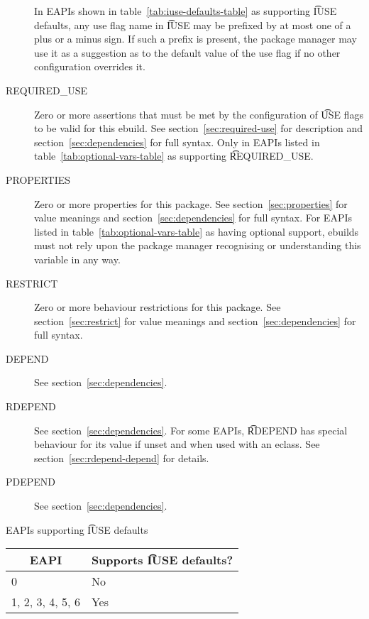 \begin{description}
     In EAPIs shown in table~\ref{tab:iuse-defaults-table} as supporting
    \t{IUSE} defaults, any use flag name in \t{IUSE} may be prefixed by at most one of a plus or a
    minus sign. If such a prefix is present, the package manager may use it as a suggestion as to
    the default value of the use flag if no other configuration overrides it.
\item[REQUIRED_USE]  Zero or more assertions that must be met by the
    configuration of \t{USE} flags to be valid for this ebuild. See section~\ref{sec:required-use}
    for description and section~\ref{sec:dependencies} for full syntax. Only in EAPIs listed in
    table~\ref{tab:optional-vars-table} as supporting \t{REQUIRED_USE}.
\item[PROPERTIES]  Zero or more properties for this package.
    See section~\ref{sec:properties} for value meanings and section~\ref{sec:dependencies} for full
    syntax. For EAPIs listed in table~\ref{tab:optional-vars-table} as having optional support,
    ebuilds must not rely upon the package manager recognising or understanding this variable in
    any way.
\item[RESTRICT] Zero or more behaviour restrictions for this package. See section~\ref{sec:restrict}
    for value meanings and section~\ref{sec:dependencies} for full syntax.
\item[DEPEND] See section~\ref{sec:dependencies}.
\item[RDEPEND] See section~\ref{sec:dependencies}. For some EAPIs, \t{RDEPEND} has special behaviour
    for its value if unset and when used with an eclass. See section~\ref{sec:rdepend-depend} for
    details.
\item[PDEPEND] See section~\ref{sec:dependencies}.
\end{description}

\begin{centertable}{EAPIs supporting \t{IUSE} defaults}
    \label{tab:iuse-defaults-table}
    \begin{tabular}{ll}
      \toprule
      \multicolumn{1}{c}{\textbf{EAPI}} &
      \multicolumn{1}{c}{\textbf{Supports \t{IUSE} defaults?}} \\
      \midrule
      0                 & No  \\
      1, 2, 3, 4, 5, 6  & Yes \\
      \bottomrule
    \end{tabular}
\end{centertable}

